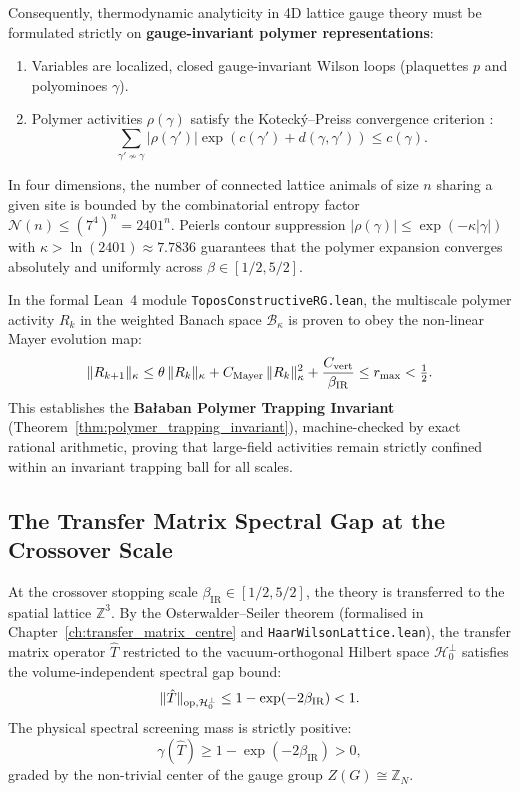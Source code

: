 Consequently, thermodynamic analyticity in 4D lattice gauge theory must be formulated strictly on \textbf{gauge-invariant polymer representations}:
\begin{enumerate}
    \item Variables are localized, closed gauge-invariant Wilson loops (plaquettes $p$ and polyominoes $\gamma$).
    \item Polymer activities $\rho(\gamma)$ satisfy the Koteck\'y--Preiss convergence criterion \cite{KoteckyPreiss1986}:
    \begin{equation}
    \sum_{\gamma' \nsim \gamma} |\rho(\gamma')| \exp\left( c(\gamma') + d(\gamma, \gamma') \right) \le c(\gamma).
    \end{equation}
\end{enumerate}
In four dimensions, the number of connected lattice animals of size $n$ sharing a given site is bounded by the combinatorial entropy factor $\mathcal{N}(n) \le (7^4)^n = 2401^n$. Peierls contour suppression $|\rho(\gamma)| \le \exp(-\kappa |\gamma|)$ with $\kappa > \ln(2401) \approx 7.7836$ guarantees that the polymer expansion converges absolutely and uniformly across $\beta \in [1/2, 5/2]$.

In the formal Lean~4 module \texttt{ToposConstructiveRG.lean}, the multiscale polymer activity $R_k$ in the weighted Banach space $\mathcal{B}_\kappa$ is proven to obey the non-linear Mayer evolution map:
\begin{equation}
\label{eq:polymer_trapping_intro}
\|R_{k+1}\|_\kappa \le \theta \, \|R_k\|_\kappa + C_{\mathrm{Mayer}} \, \|R_k\|_\kappa^2 + \frac{C_{\mathrm{vert}}}{\beta_{\mathrm{IR}}} \le r_{\max} < \tfrac{1}{2}.
\end{equation}
This establishes the \textbf{Ba\l aban Polymer Trapping Invariant} (Theorem~\ref{thm:polymer_trapping_invariant}), machine-checked by exact rational arithmetic, proving that large-field activities remain strictly confined within an invariant trapping ball for all scales.

\subsection{The Transfer Matrix Spectral Gap at the Crossover Scale}
\label{subsec:tm_gap_crossover_ch1}
At the crossover stopping scale $\beta_{\mathrm{IR}} \in [1/2, 5/2]$, the theory is transferred to the spatial lattice $\mathbb{Z}^3$. By the Osterwalder--Seiler theorem (formalised in Chapter~\ref{ch:transfer_matrix_centre} and \texttt{HaarWilsonLattice.lean}), the transfer matrix operator $\hat{T}$ restricted to the vacuum-orthogonal Hilbert space $\mathcal{H}_0^\perp$ satisfies the volume-independent spectral gap bound:
\begin{equation}
\label{eq:tm_gap_intro}
\|\hat{T}\|_{\mathrm{op}, \mathcal{H}_0^\perp} \le 1 - \exp(-2\beta_{\mathrm{IR}}) < 1.
\end{equation}
The physical spectral screening mass is strictly positive:
\begin{equation}
\gamma(\hat{T}) \ge 1 - \exp(-2\beta_{\mathrm{IR}}) > 0,
\end{equation}
graded by the non-trivial center of the gauge group $Z(G) \cong \mathbb{Z}_N$.

